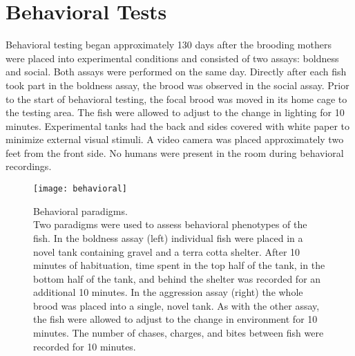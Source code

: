 \documentclass[12pt,twoside]{reedthesis}
\begin{document}
\section{Behavioral Tests}

Behavioral testing began approximately 130 days after the brooding mothers were
placed into experimental conditions and consisted of two assays: boldness and social. Both assays were performed on the same day.
Directly after each fish took part in the boldness assay, the brood was observed in the
social assay.
Prior to the start of behavioral testing, the focal brood was moved in its home cage to the
testing area. The fish were allowed to adjust to the change in lighting for 10
minutes. Experimental tanks had the back and sides covered with white paper to
minimize external visual stimuli. A video camera was placed approximately two
feet from the front side. No humans were present in the room during behavioral recordings. 

\begin{figure}[htbp] 
\begin{centering} 
\texttt{[image: behavioral]}
\caption[Behavioral paradigms]{\footnotesize{Behavioral paradigms. \\ Two paradigms were used to assess
  behavioral phenotypes of the fish. In the boldness assay (left) individual
  fish were placed in a novel tank containing gravel and a terra cotta shelter.
  After 10 minutes of habituation, time spent in the top half of the tank, in
  the bottom half of the tank, and behind the shelter was recorded for an
  additional 10 minutes. In the
  aggression assay (right) the whole brood was placed into a single, novel tank.
  As with the other assay, the fish were allowed to adjust to the change in
  environment for 10 minutes.
The number of chases, charges, and bites between fish were recorded for 10 minutes.}}
\label{subd}
\end{centering} 
\end{figure}
\end{document}
